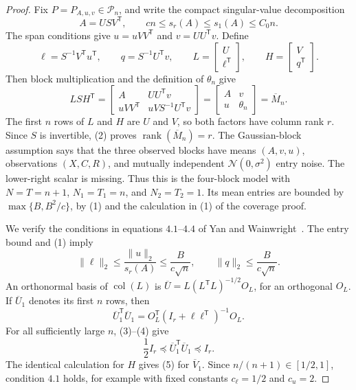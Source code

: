 \documentclass{article}
\begin{document}
\begin{proof}
Fix \(P=P_{A,u,v}\in\mathcal P_n\), and write the compact singular-value decomposition
\[
A=USV^{\mathsf T},
\qquad cn\le s_r(A)\le s_1(A)\le C_0n.
\tag{1}
\]
The span conditions give \(u=uVV^{\mathsf T}\) and \(v=UU^{\mathsf T}v\).  Define
\[
\ell=S^{-1}V^{\mathsf T}u^{\mathsf T},\qquad
q=S^{-1}U^{\mathsf T}v,\qquad
L=\begin{bmatrix}U\\ \ell^{\mathsf T}\end{bmatrix},\qquad
H=\begin{bmatrix}V\\ q^{\mathsf T}\end{bmatrix}.
\]
Then block multiplication and the definition of \(\theta_n\) give
\[
LSH^{\mathsf T}
=\begin{bmatrix}
A&UU^{\mathsf T}v\\
uVV^{\mathsf T}&uVS^{-1}U^{\mathsf T}v
\end{bmatrix}
=\begin{bmatrix}A&v\\u&\theta_n\end{bmatrix}
=\overline M_n.
\tag{2}
\]
The first \(n\) rows of \(L\) and \(H\) are \(U\) and \(V\), so both factors have column rank \(r\).  Since \(S\) is invertible, (2) proves \(\operatorname{rank}(\overline M_n)=r\).  The Gaussian-block assumption says that the three observed blocks have means \((A,v,u)\), observations \((X,C,R)\), and mutually independent \(\mathcal N(0,\sigma^2)\) entry noise.  The lower-right scalar is missing.  Thus this is the four-block model with \(N=T=n+1\), \(N_1=T_1=n\), and \(N_2=T_2=1\).  Its mean entries are bounded by \(\max\{B,B^2/c\}\), by (1) and the calculation in (1) of the coverage proof.

We verify the conditions in equations \(4.1\)--\(4.4\) of Yan and Wainwright~\cite{YanWainwright2024}.  The entry bound and (1) imply
\[
\|\ell\|_2\le\frac{\|u\|_2}{s_r(A)}
\le\frac{B}{c\sqrt n},
\qquad
\|q\|_2\le\frac{B}{c\sqrt n}.
\tag{3}
\]
An orthonormal basis of \(\operatorname{col}(L)\) is \(\overline U=L(L^{\mathsf T}L)^{-1/2}O_L\), for an orthogonal \(O_L\).  If \(\overline U_1\) denotes its first \(n\) rows, then
\[
\overline U_1^{\mathsf T}\overline U_1
=O_L^{\mathsf T}(I_r+\ell\ell^{\mathsf T})^{-1}O_L.
\tag{4}
\]
For all sufficiently large \(n\), (3)--(4) give
\[
\frac12 I_r\preceq\overline U_1^{\mathsf T}\overline U_1\preceq I_r.
\tag{5}
\]
The identical calculation for \(H\) gives (5) for \(\overline V_1\).  Since \(n/(n+1)\in[1/2,1]\), condition \(4.1\) holds, for example with fixed constants \(c_\ell=1/2\) and \(c_u=2\).


\end{proof}
\end{document}
